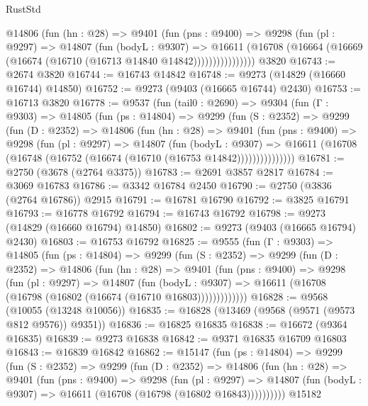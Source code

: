 \begin{lexlean}{RustStd}
\begin{coremodule}
              @14806
                (fun (hn : @28) =>
                @9401
                  (fun (pns : @9400) =>
                  @9298
                    (fun (pl : @9297) =>
                    @14807
                      (fun (bodyL : @9307) =>
                      @16611
                        (@16708
                          (@16664 (@16669 (@16674 (@16710 (@16713 @14840 @14842))))))))))))))))
    @3820
@16743 := @2674 @3820
@16744 := @16743 @14842
@16748 := @9273 (@14829 (@16660 @16744) @14850)
@16752 := @9273 (@9403 (@16665 @16744) @2430)
@16753 := @16713 @3820
@16778 := @9537
    (fun (tail0 : @2690) =>
    @9304
      (fun (Γ : @9303) =>
      @14805
        (fun (ps : @14804) =>
        @9299
          (fun (S : @2352) =>
          @9299
            (fun (D : @2352) =>
            @14806
              (fun (hn : @28) =>
              @9401
                (fun (pns : @9400) =>
                @9298
                  (fun (pl : @9297) =>
                  @14807
                    (fun (bodyL : @9307) =>
                    @16611 (@16708 (@16748 (@16752 (@16674 (@16710 (@16753 @14842)))))))))))))))
@16781 := @2750 (@3678 (@2764 @3375))
@16783 := @2691 @3857 @2817
@16784 := @3069 @16783
@16786 := @3342 @16784 @2450
@16790 := @2750 (@3836 (@2764 @16786)) @2915
@16791 := @16781 @16790
@16792 := @3825 @16791
@16793 := @16778 @16792
@16794 := @16743 @16792
@16798 := @9273 (@14829 (@16660 @16794) @14850)
@16802 := @9273 (@9403 (@16665 @16794) @2430)
@16803 := @16753 @16792
@16825 := @9555
    (fun (Γ : @9303) =>
    @14805
      (fun (ps : @14804) =>
      @9299
        (fun (S : @2352) =>
        @9299
          (fun (D : @2352) =>
          @14806
            (fun (hn : @28) =>
            @9401
              (fun (pns : @9400) =>
              @9298
                (fun (pl : @9297) =>
                @14807
                  (fun (bodyL : @9307) =>
                  @16611 (@16708 (@16798 (@16802 (@16674 (@16710 @16803)))))))))))))
@16828 := @9568 (@10055 (@13248 @10056))
@16835 := @16828 (@13469 (@9568 (@9571 (@9573 @812 @9576)) @9351))
@16836 := @16825 @16835
@16838 := @16672 (@9364 @16835)
@16839 := @9273 @16838
@16842 := @9371 @16835 @16709 @16803
@16843 := @16839 @16842
@16862 := @15147
    (fun (ps : @14804) =>
    @9299
      (fun (S : @2352) =>
      @9299
        (fun (D : @2352) =>
        @14806
          (fun (hn : @28) =>
          @9401
            (fun (pns : @9400) =>
            @9298
              (fun (pl : @9297) =>
              @14807 (fun (bodyL : @9307) => @16611 (@16708 (@16798 (@16802 @16843))))))))))
    @15182

\end{coremodule}
\end{lexlean}
